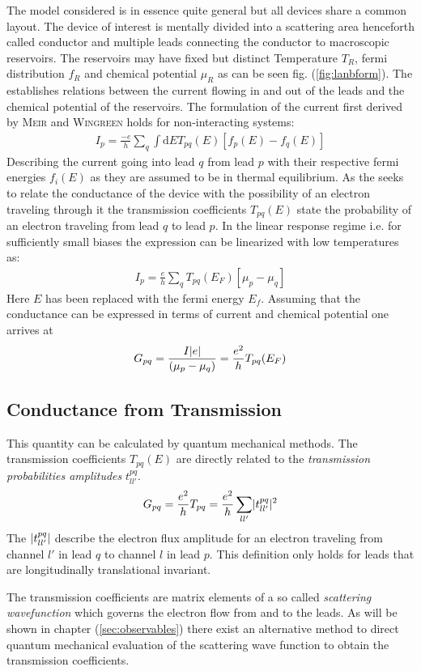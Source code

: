The model considered is in essence quite general but all devices share a common layout. The device of interest is mentally divided into a scattering area henceforth called conductor and multiple leads connecting the conductor to macroscopic reservoirs. The reservoirs may have fixed but distinct Temperature $T_R$, fermi distribution $f_R$ and chemical potential $\mu_R$ as can be seen fig. (\ref{fig:lanbform}).
The \lanbform{} establishes relations between the current flowing in and out of the leads and the chemical potential of the reservoirs. The formulation of the current first derived by \textsc{Meir} and \textsc{Wingreen}\cite{} holds for non-interacting systems:
\begin{align}
I_p=\frac{-e}{h} \sum_q \int \text{d}E T_{pq}(E) [f_p(E) - f_q(E)]
\label{eqn:current}
\end{align}
Describing the current going into lead $q$ from lead $p$ with their respective fermi energies $f_i(E)$ as they are assumed to be in thermal equilibrium. 
As the \lanbform{} seeks to relate the conductance of the device with the possibility of an electron traveling through it the transmission coefficients $T_{pq}(E)$ state the probability of an electron traveling from lead $q$ to lead $p$. 
In the linear response regime i.e. for sufficiently small biases the expression can be linearized with low temperatures as:
\begin{align}
I_p=\frac{e}{h} \sum_q T_{pq}(E_F) [\mu_p - \mu_q]
\label{eqn:currentlin}
\end{align}
Here $E$ has been replaced with the fermi energy $E_f$.
Assuming that the conductance can be expressed in terms of current and chemical potential one arrives at
\begin{align}
G_{pq}=\frac{I\lvert e\rvert}{(\mu_p - \mu_q)}=\frac{e^2}{h} T_{pq}(E_F)
\label{eqn:conductance}
\end{align}
\subsection{Conductance from Transmission}
This quantity can be calculated by quantum mechanical methods. The transmission coefficients $T_{pq}(E)$ are directly related to the \emph{transmission probabilities amplitudes} $t^{pq}_{ll'}$.
\begin{align}
G_{pq}=\frac{e^2}{h} T_{pq} =\frac{e^2}{h} \sum_{ll'} \lvert t^{pq}_{ll'}\rvert^2
\label{eqn:transcoeff}
\end{align}
The $\lvert t^{pq}_{ll'}\rvert$ describe the electron flux amplitude for an electron traveling from channel $l'$ in lead $q$ to channel $l$ in lead $p$. This definition only holds for leads that are longitudinally translational invariant.\par
The transmission coefficients are matrix elements of a so called \emph{scattering wavefunction} which governs the electron flow from and to the leads. As will be shown in chapter (\ref{sec:observables}) there exist an alternative method to direct quantum mechanical evaluation of the scattering wave function to obtain the transmission coefficients.
